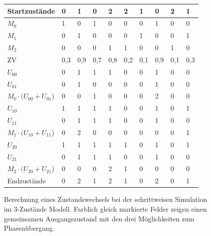 \begin{figure}
\centering
 \begin{tabular}{ l || l | l | l | l | l | l | l | l | l }
  \hline
  Startzustände & \cellcolor{orange!25}0 & \cellcolor{blue!25} 1 & \cellcolor{orange!25}0 & \cellcolor{green!25}2 & \cellcolor{green!25}2 & \cellcolor{blue!25} 1 & \cellcolor{orange!25}0 & \cellcolor{green!25}2 & \cellcolor{blue!25} 1 \\ \hline \hline 
  $M_0$ & \cellcolor{orange!25}1 & 0 & \cellcolor{orange!25}1 & 0 & 0 & 0 & \cellcolor{orange!25}1 & 0 & 0 \\ 
  $M_1$ & 0 & \cellcolor{blue!25}1 & 0 & 0 & 0 & \cellcolor{blue!25}1 & 0 & 0 & \cellcolor{blue!25}1 \\
  $M_2$ & 0 & 0 & 0 & \cellcolor{green!25}1 & \cellcolor{green!25}1 & 0 & 0 & \cellcolor{green!25}1 & 0 \\ \hline \hline
  ZV & 0,3 & 0,9 & 0,7 & 0,8 & 0,2 & 0,1 & 0,9 & 0,1 & 0,3 \\ \hline \hline
  $U_{00}$ & 0 & 1 & 1 & 1 & 0 & 0 & 1 & 0 & 0 \\ 
  $U_{01}$ & 0 & 1 & 0 & 0 & 0 & 0 & 1 & 0 & 0 \\ \hline
  $M_0\cdot (U_{00} + U_{01}$) & \cellcolor{orange!25}0 & 0 & \cellcolor{orange!25}1 & 0 & 0 & 0 & \cellcolor{orange!25}2 & 0 & 0 \\ \hline \hline
  $U_{10}$ & 1 & 1 & 1 & 1 & 0 & 0 & 1 & 0 & 1 \\ 
  $U_{11}$ & 0 & 1 & 1 & 1 & 0 & 0 & 1 & 0 & 0 \\ \hline
  $M_1 \cdot (U_{10}+U_{11}$) & 0 & \cellcolor{blue!25}2 & 0 & 0 & 0 & \cellcolor{blue!25}0 & 0 & 0 & \cellcolor{blue!25}1 \\ \hline \hline
  $U_{20}$ & 1 & 1 & 1 & 1 & 1 & 0 & 1 & 0 & 1 \\ 
  $U_{21}$ & 0 & 1 & 1 & 1 & 0 & 0 & 1 & 0 & 0 \\ \hline
  $M_2\cdot (U_{20}+U_{21}$) & 0 & 0 & 0 & \cellcolor{green!25}2 & \cellcolor{green!25}1 & 0 & 0 & \cellcolor{green!25}0 & 0 \\ \hline \hline
  Endzustände & \cellcolor{orange!25}0 & \cellcolor{blue!25}2 & \cellcolor{orange!25}1 & \cellcolor{green!25}2 & \cellcolor{green!25}1 & \cellcolor{blue!25}0 & \cellcolor{orange!25}2 & \cellcolor{green!25}0 & \cellcolor{blue!25}1 \\ \hline
 \end{tabular}
\caption[Berechnung eines Zustandswechsels bei der schrittweisen Simulation im 3-Zustände Modell]{Berechnung eines Zustandswechsels bei der schrittweisen Simulation im 3-Zustände Modell. 
Farblich gleich markierte Felder zeigen einen gemeinsamen Ausgangszustand mit den drei Möglichkeiten zum Phasenübergang.}
\label{3s_by_step_tabelle}
\end{figure}

